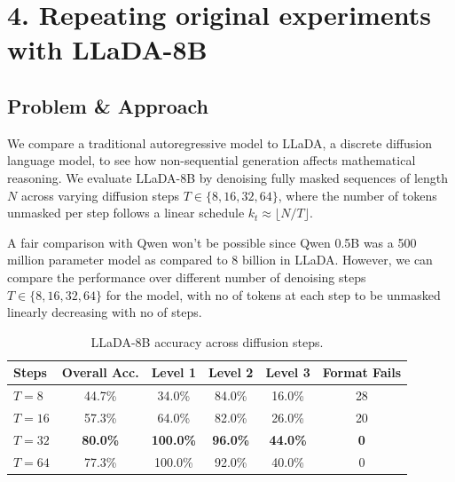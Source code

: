 \section*{4. Repeating original experiments with LLaDA-8B}

\subsection*{Problem \& Approach}
We compare a traditional autoregressive model to LLaDA, a discrete diffusion language model, to see how non-sequential generation affects mathematical reasoning. We evaluate LLaDA-8B by denoising fully masked sequences of length $N$ across varying diffusion steps $T \in \{8, 16, 32, 64\}$, where the number of tokens unmasked per step follows a linear schedule $k_t \approx \lfloor N/T \rfloor$.

A fair comparison with Qwen won't be possible since Qwen 0.5B was a 500 million  parameter model as compared to 8 billion in LLaDA.
However, we can compare the performance over different number of denoising steps $T \in \{8, 16, 32, 64\}$ for the model, with no of tokens at each step to be unmasked linearly decreasing with no of steps.

\begin{table}[h]
\centering
\begin{tabular}{l c c c c c}
\toprule
\textbf{Steps} & \textbf{Overall Acc.} & \textbf{Level 1} & \textbf{Level 2} & \textbf{Level 3} & \textbf{Format Fails} \\
\midrule
$T = 8$  & 44.7\%  & 34.0\%  & 84.0\%  & 16.0\%  & 28 \\
$T = 16$ & 57.3\%  & 64.0\%  & 82.0\%  & 26.0\%  & 20 \\
$T = 32$ & \textbf{80.0\%} & \textbf{100.0\%} & \textbf{96.0\%}  & \textbf{44.0\%}  & \textbf{0} \\
$T = 64$ & 77.3\% & 100.0\% & 92.0\%  & 40.0\%  & 0 \\
\bottomrule
\end{tabular}
\caption{LLaDA-8B accuracy across diffusion steps.}
\label{tab:llada_results}
\end{table}



